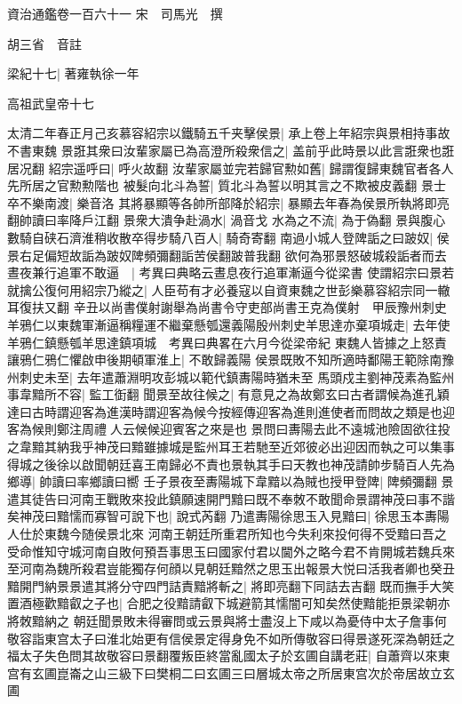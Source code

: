 資治通鑑卷一百六十一
宋　司馬光　撰

胡三省　音註

梁紀十七|{
	著雍執徐一年}


高祖武皇帝十七

太清二年春正月己亥慕容紹宗以鐵騎五千夹擊侯景|{
	承上卷上年紹宗與景相持事故不書東魏}
景誑其衆曰汝輩家屬已為高澄所殺衆信之|{
	盖前乎此時景以此言誑衆也誑居况翻}
紹宗遥呼曰|{
	呼火故翻}
汝輩家屬並完若歸官勲如舊|{
	歸謂復歸東魏官者各人先所居之官勲勲階也}
被髮向北斗為誓|{
	質北斗為誓以明其言之不欺被皮義翻}
景士卒不樂南渡|{
	樂音洛}
其將暴顯等各帥所部降於紹宗|{
	暴顯去年春為侯景所執將即亮翻帥讀曰率降戶江翻}
景衆大潰争赴渦水|{
	渦音戈}
水為之不流|{
	為于偽翻}
景與腹心數騎自硖石濟淮稍收散卒得步騎八百人|{
	騎奇寄翻}
南過小城人登陴詬之曰跛奴|{
	侯景右足偏短故詬為跛奴陴頻彌翻詬苦侯翻跛普我翻}
欲何為邪景怒破城殺詬者而去晝夜兼行追軍不敢逼　|{
	考異曰典略云晝息夜行追軍漸逼今從梁書}
使謂紹宗曰景若就擒公復何用紹宗乃縱之|{
	人臣苟有才必養寇以自資東魏之世彭樂慕容紹宗同一轍耳復扶又翻}
辛丑以尚書僕射謝舉為尚書令守吏部尚書王克為僕射　甲辰豫州刺史羊鴉仁以東魏軍漸逼稱糧運不繼棄懸瓠還義陽殷州刺史羊思達亦棄項城走|{
	去年使羊鴉仁鎮懸瓠羊思達鎮項城　考異曰典畧在六月今從梁帝紀}
東魏人皆據之上怒責讓鴉仁鴉仁懼啟申後期頓軍淮上|{
	不敢歸義陽}
侯景既敗不知所適時鄱陽王範除南豫州刺史未至|{
	去年遣蕭淵明攻彭城以範代鎮夀陽時猶未至}
馬頭戍主劉神茂素為監州事韋黯所不容|{
	監工衘翻}
聞景至故往候之|{
	有意見之為故鄭玄曰古者謂候為進孔穎達曰古時謂迎客為進漢時謂迎客為候今按經傳迎客為進則進使者而問故之類是也迎客為候則鄭注周禮人云候候迎賓客之來是也}
景問曰夀陽去此不遠城池險固欲往投之韋黯其納我乎神茂曰黯雖據城是監州耳王若馳至近郊彼必出迎因而執之可以集事得城之後徐以啟聞朝廷喜王南歸必不責也景執其手曰天教也神茂請帥步騎百人先為鄉導|{
	帥讀曰率鄉讀曰嚮}
壬子景夜至夀陽城下韋黯以為賊也授甲登陴|{
	陴頻彌翻}
景遣其徒告曰河南王戰敗來投此鎮願速開門黯曰既不奉敇不敢聞命景謂神茂曰事不諧矣神茂曰黯懦而寡智可說下也|{
	說式芮翻}
乃遣夀陽徐思玉入見黯曰|{
	徐思玉本夀陽人仕於東魏今随侯景北來}
河南王朝廷所重君所知也今失利來投何得不受黯曰吾之受命惟知守城河南自敗何預吾事思玉曰國家付君以閫外之略今君不肯開城若魏兵來至河南為魏所殺君豈能獨存何顔以見朝廷黯然之思玉出報景大悦曰活我者卿也癸丑黯開門納景景遣其將分守四門詰責黯將斬之|{
	將即亮翻下同詰去吉翻}
既而撫手大笑置酒極歡黯叡之子也|{
	合肥之役黯請叡下城避箭其懦闇可知矣然使黯能拒景梁朝亦將敇黯納之}
朝廷聞景敗未得審問或云景與將士盡沒上下咸以為憂侍中太子詹事何敬容詣東宫太子曰淮北始更有信侯景定得身免不如所傳敬容曰得景遂死深為朝廷之福太子失色問其故敬容曰景翻覆叛臣終當亂國太子於玄圃自講老莊|{
	自蕭齊以來東宫有玄圃崑崙之山三級下曰樊桐二曰玄圃三曰層城太帝之所居東宫次於帝居故立玄圃}
